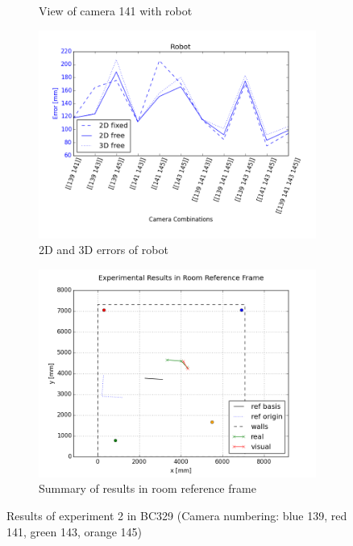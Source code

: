 \begin{figure}[H]
\begin{subfigure}{0.49\linewidth}
        \caption{View of camera 141 with robot}
        \label{fig:res2_0_image_141}
    \end{subfigure}
    \begin{subfigure}{0.49\linewidth}
        \includegraphics[width=\linewidth]{files/res2_combi_rob.png}
        \caption{2D and 3D errors of robot}
        \label{fig:res2_combi}
    \end{subfigure}
    \begin{subfigure}{\linewidth}
        \centering
        \includegraphics[width=.9\linewidth]{files/res2_room.png}
        \caption{Summary of results in room reference frame}
        \label{fig:res2_room}
    \end{subfigure}
    \caption{Results of experiment 2 in BC329 (Camera numbering: blue 139, red 141, green 143, orange 145)}
    \label{fig:experiment1}
\end{figure}




